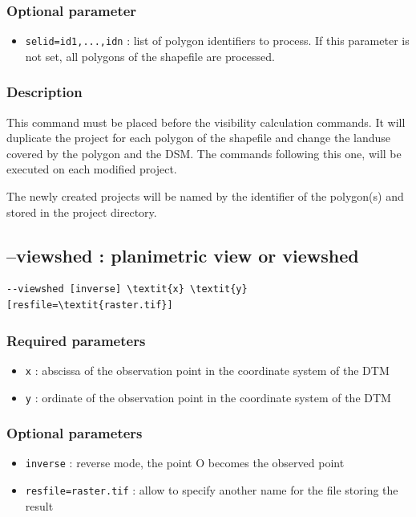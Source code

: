 \documentclass{report}
\begin{document}
\subsubsection{Optional parameter}
\begin{itemize}
	\item \verb|selid=id1,...,idn| : list of polygon identifiers to process. If this parameter is not set, all polygons of the shapefile are processed.
\end{itemize}

\subsubsection{Description}
This command must be placed before the visibility calculation commands. It will duplicate the project for each polygon of the shapefile and change the landuse covered by the polygon and the DSM. The commands following this one, will be executed on each modified project.

The newly created projects will be named by the identifier of the polygon(s) and stored in the project directory.

\subsection{--viewshed : planimetric view or viewshed}
\begin{Verbatim}[commandchars=\\\{\}]
--viewshed [inverse] \textit{x} \textit{y} [resfile=\textit{raster.tif}]
\end{Verbatim}

\subsubsection{Required parameters}
\begin{itemize}
	\item \verb|x| : abscissa of the observation point in the coordinate system of the DTM
	\item \verb|y| : ordinate of the observation point in the coordinate system of the DTM
\end{itemize}

\subsubsection{Optional parameters}
\begin{itemize}
	\item \verb|inverse| : reverse mode, the point O becomes the observed point
	\item \verb|resfile=raster.tif| : allow to specify another name for the file storing the result
\end{itemize}
\end{document}
